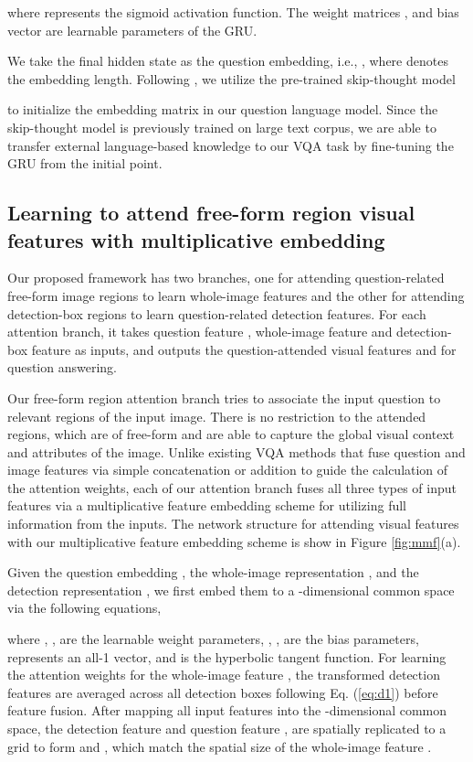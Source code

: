 \documentclass[letterpaper]{article}
\begin{document}
where  represents the sigmoid activation function. The weight matrices ,  and bias vector  are learnable parameters of the GRU.

We take the final hidden state  as the question embedding, i.e., , where  denotes the embedding length. Following \cite{li2016visual,kim2016hadamard}, we utilize the pre-trained skip-thought model {\cite{kiros2015skip} to initialize the embedding matrix  in our question language model. Since the skip-thought model is previously trained on large text corpus, we are able to transfer external language-based knowledge to our VQA task by fine-tuning the GRU from the initial point.


\subsection{Learning to attend free-form region visual features with multiplicative embedding}\label{32}

Our proposed framework has two branches, one for attending question-related free-form image regions to learn whole-image features and the other for attending detection-box regions to learn question-related detection features. For each attention branch, it takes question feature , whole-image feature  and detection-box feature  as inputs, and outputs the question-attended visual features  and  for question answering.

Our free-form region attention branch tries to associate the input question to relevant regions of the input image. There is no restriction to the attended regions, which are of free-form and are able to capture the global visual context and attributes of the image. Unlike existing VQA methods that fuse question and image features via simple concatenation \cite{shih2016look} or addition \cite{lu2016hierarchical} to guide the calculation of the attention weights, each of our attention branch fuses all three types of input features via a multiplicative feature embedding scheme for  utilizing full information from the inputs. The network structure for attending visual features with our multiplicative feature embedding scheme is show in Figure \ref{fig:mmf}(a).


Given the question embedding , the whole-image representation , and the detection representation , we first embed them to a -dimensional common space via the following equations,

where , ,  are the learnable weight parameters, , ,   are the bias parameters,  represents an all-1 vector, and  is the hyperbolic tangent function. For learning the attention weights for the whole-image feature , the transformed detection features are averaged across all detection boxes following Eq. (\ref{eq:d1}) before feature fusion. After mapping all input features into the -dimensional common space, the detection feature  and question feature , are spatially replicated to a  grid to form  and , which match the spatial size of the whole-image feature .

}
\end{document}
